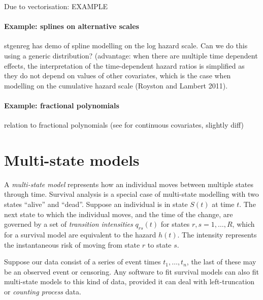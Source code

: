 \documentclass[nojss,nofooter]{jss}
\begin{document}
Due to vectorisation:  EXAMPLE



\paragraph{Example: splines on alternative scales}

stgenreg has demo of spline modelling on the log hazard scale.  Can we do this using a generic distribution? 
(advantage: when there are multiple time dependent effects, the
interpretation of the time-dependent hazard ratios is simplified as
they do not depend on values of other covariates, which is the case
when modelling on the cumulative hazard scale (Royston and Lambert
2011).

\paragraph{Example: fractional polynomials}


relation to fractional polynomials 
(see  for continuous covariates, slightly diff)


\section{Multi-state models}

A \emph{multi-state model} represents how an individual moves between
multiple states through time.  Survival analysis is a special case of
multi-state modelling with two states ``alive'' and ``dead''. Suppose
an individual is in state $S(t)$ at time $t$.  The next state to which
the individual moves, and the time of the change, are governed by a
set of \emph{transition intensities} $q_{rs}(t)$ for states $r, s =
1,\dots,R$, which for a survival model are equivalent to the hazard
$h(t)$.  The intensity represents the instantaneous risk of moving
from state $r$ to state $s$.

Suppose our data consist of a series of event times $t_{1},\dots,
t_{n}$, the last of these may be an observed event or censoring.  Any
software to fit survival models can also fit multi-state models to
this kind of data, provided it can deal with left-truncation or
\emph{counting process} data.
\end{document}
